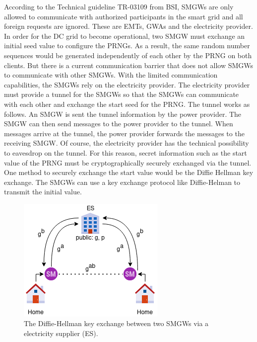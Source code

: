 According to the Technical guideline TR-03109 from BSI, SMGWs are only allowed to communicate with authorized participants in the smart grid and all foreign requests are ignored. These are EMTs, GWAs and the electricity provider. In order for the DC grid to become operational, two SMGW must exchange an initial seed value to configure the PRNGs. %
As a result, the same random number sequences would be generated independently of each other by the PRNG on both clients. But there is a current communication barrier that does not allow SMGWs to communicate with other SMGWs. With the limited communication capabilities, the SMGWs rely on the electricity provider. The electricity provider must provide a tunnel for the SMGWs so that the SMGWs can communicate with each other and exchange the start seed for the PRNG. The tunnel works as follows. An SMGW is sent the tunnel information by the power provider. The SMGW can then send messages to the power provider to the tunnel. When messages arrive at the tunnel, the power provider forwards the messages to the receiving SMGW. Of course, the electricity provider has the technical possibility to eavesdrop on the tunnel. For this reason, secret information such as the start value of the PRNG must be cryptographically securely exchanged via the tunnel. One method to securely exchange the start value would be the Diffie Hellman key exchange.%
The SMGWs can use a key exchange protocol like Diffie-Helman to transmit the initial value. %
\begin{figure}[tbp]
  \centering
  \includegraphics[scale=0.7]{images/key_exchange.png}
  \caption[Diffie-Hellman Key Exchange in TR-03109]{The Diffie-Hellman key exchange between two SMGWs via a electricity supplier (ES).}
  \label{fig:keyexchange}
\end{figure}
